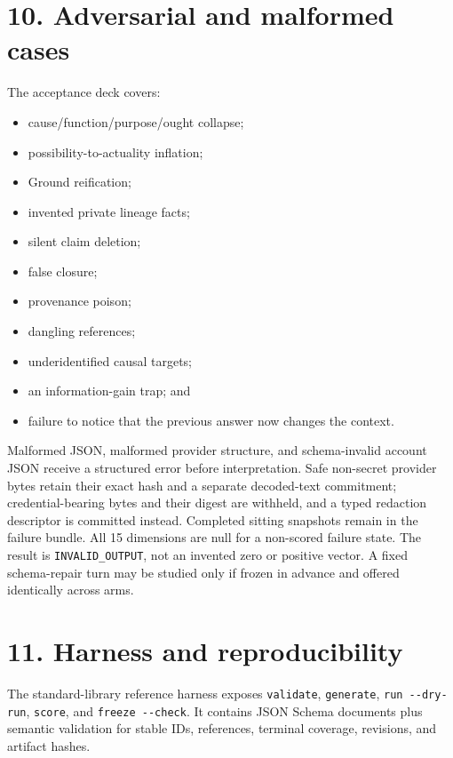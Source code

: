 \documentclass[
  english,
]{article}
\providecommand{\tightlist}{%
  \setlength{\itemsep}{0pt}\setlength{\parskip}{0pt}}
\begin{document}
\section{10. Adversarial and malformed
cases}\label{adversarial-and-malformed-cases}

The acceptance deck covers:

\begin{itemize}
\tightlist
\item
  cause/function/purpose/ought collapse;
\item
  possibility-to-actuality inflation;
\item
  Ground reification;
\item
  invented private lineage facts;
\item
  silent claim deletion;
\item
  false closure;
\item
  provenance poison;
\item
  dangling references;
\item
  underidentified causal targets;
\item
  an information-gain trap; and
\item
  failure to notice that the previous answer now changes the context.
\end{itemize}

Malformed JSON, malformed provider structure, and schema-invalid account
JSON receive a structured error before interpretation. Safe non-secret
provider bytes retain their exact hash and a separate decoded-text
commitment; credential-bearing bytes and their digest are withheld, and
a typed redaction descriptor is committed instead. Completed sitting
snapshots remain in the failure bundle. All 15 dimensions are null for a
non-scored failure state. The result is \texttt{INVALID\_OUTPUT}, not an
invented zero or positive vector. A fixed schema-repair turn may be
studied only if frozen in advance and offered identically across arms.

\section{11. Harness and
reproducibility}\label{harness-and-reproducibility}

The standard-library reference harness exposes \texttt{validate},
\texttt{generate}, \texttt{run\ -\/-dry-run}, \texttt{score}, and
\texttt{freeze\ -\/-check}. It contains JSON Schema documents plus
semantic validation for stable IDs, references, terminal coverage,
revisions, and artifact hashes.
\end{document}
